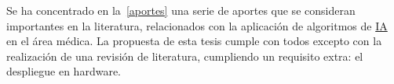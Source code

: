 Se ha concentrado en la~\autoref{aportes} una serie de aportes que se consideran
importantes en la literatura, relacionados con la aplicación de algoritmos de
\hyperlink{abbr}{IA} en el área médica. La propuesta de esta tesis cumple con
todos excepto con la realización de una revisión de literatura, cumpliendo un
requisito extra: el despliegue en hardware.

\begin{table}[H]
    \centering
\end{table}

